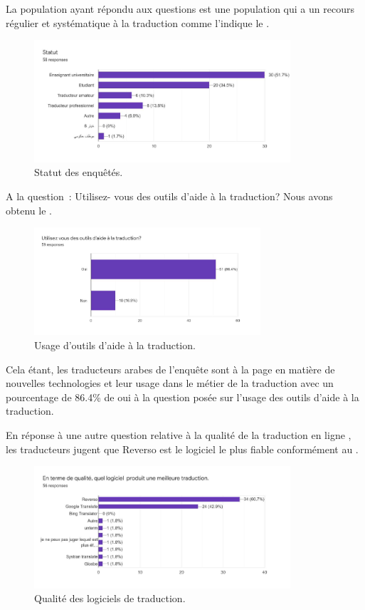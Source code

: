 \documentclass{textolivre}
\begin{document}
La population ayant répondu aux questions est une population qui a un recours régulier et systématique à la traduction comme l’indique le .

\begin{figure}[htbp]
 \centering
 \includegraphics[width=0.85\textwidth]{figure02.pdf}
 \caption{Statut des enquêtés.}
 \label{fig-02}
\end{figure}

A la question : Utilisez- vous des outils d’aide à la traduction? Nous avons obtenu le .

\begin{figure}[htbp]
 \centering
 \includegraphics[width=0.75\textwidth]{figure03.pdf}
 \caption{Usage d’outils d’aide à la traduction.}
 \label{fig-03}
\end{figure}

Cela étant, les traducteurs arabes de l’enquête sont à la page en matière de nouvelles technologies et leur usage dans le métier de la traduction avec un pourcentage de 86.4\% de oui à la question posée sur l’usage des outils d’aide à la traduction.

En réponse à une autre question relative à la qualité de la traduction en ligne , les traducteurs jugent que Reverso est le logiciel le plus fiable conformément au . 

\begin{figure}[htbp]
 \centering
 \includegraphics[width=0.85\textwidth]{figure04.pdf}
 \caption{Qualité des logiciels de traduction.}
 \label{fig-04}
\end{figure}
\end{document}
